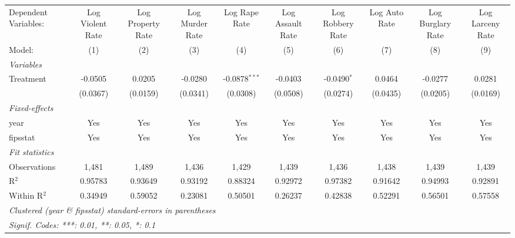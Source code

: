 
\begingroup
\centering
\begin{tabular}{lccccccccc}
   \tabularnewline \midrule \midrule
   Dependent Variables: & Log Violent Rate & Log Property Rate & Log Murder Rate & Log Rape Rate   & Log Assault Rate & Log Robbery Rate & Log Auto Rate & Log Burglary Rate & Log Larceny Rate\\  
   Model:               & (1)              & (2)               & (3)             & (4)             & (5)              & (6)              & (7)           & (8)               & (9)\\  
   \midrule
   \emph{Variables}\\
   Treatment            & -0.0505          & 0.0205            & -0.0280         & -0.0878$^{***}$ & -0.0403          & -0.0490$^{*}$    & 0.0464        & -0.0277           & 0.0281\\   
                        & (0.0367)         & (0.0159)          & (0.0341)        & (0.0308)        & (0.0508)         & (0.0274)         & (0.0435)      & (0.0205)          & (0.0169)\\   
   \midrule
   \emph{Fixed-effects}\\
   year                 & Yes              & Yes               & Yes             & Yes             & Yes              & Yes              & Yes           & Yes               & Yes\\  
   fipsstat             & Yes              & Yes               & Yes             & Yes             & Yes              & Yes              & Yes           & Yes               & Yes\\  
   \midrule
   \emph{Fit statistics}\\
   Observations         & 1,481            & 1,489             & 1,436           & 1,429           & 1,439            & 1,436            & 1,438         & 1,439             & 1,439\\  
   R$^2$                & 0.95783          & 0.93649           & 0.93192         & 0.88324         & 0.92972          & 0.97382          & 0.91642       & 0.94993           & 0.92891\\  
   Within R$^2$         & 0.34949          & 0.59052           & 0.23081         & 0.50501         & 0.26237          & 0.42838          & 0.52291       & 0.56501           & 0.57558\\  
   \midrule \midrule
   \multicolumn{10}{l}{\emph{Clustered (year \& fipsstat) standard-errors in parentheses}}\\
   \multicolumn{10}{l}{\emph{Signif. Codes: ***: 0.01, **: 0.05, *: 0.1}}\\
\end{tabular}
\par\endgroup


